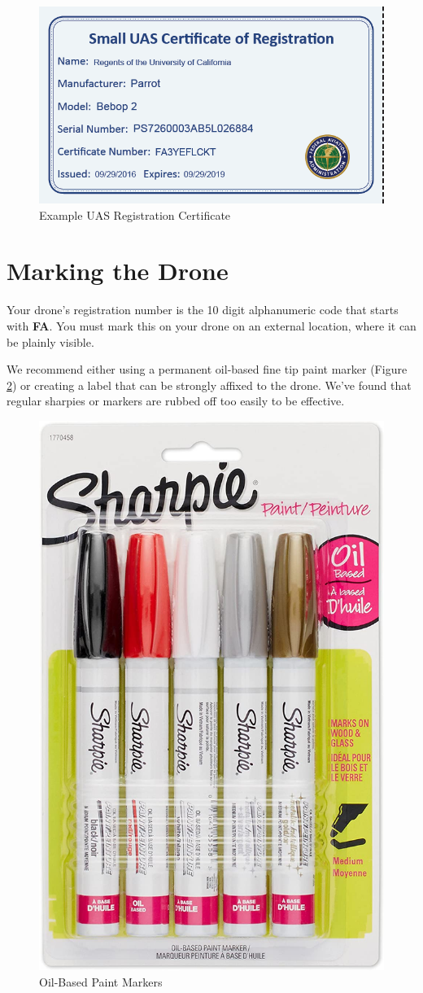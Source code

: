 \documentclass[
]{book}
\begin{document}
\begin{figure}

{\centering \includegraphics[width=0.5\linewidth]{images/reg_cert} 

}

\caption{Example UAS Registration Certificate}\label{fig:reg-cert}
\end{figure}

\hypertarget{marking-the-drone}{%
\section{Marking the Drone}\label{marking-the-drone}}

Your drone's registration number is the 10 digit alphanumeric code that starts with \textbf{FA}. You must mark this on your drone on an external location, where it can be plainly visible.

We recommend either using a permanent oil-based fine tip paint marker (Figure \ref{fig:markers}) or creating a label that can be strongly affixed to the drone. We've found that regular sharpies or markers are rubbed off too easily to be effective.

\begin{figure}

{\centering \includegraphics[width=0.5\linewidth]{images/oil-based-markers} 

}

\caption{Oil-Based Paint Markers}\label{fig:markers}
\end{figure}
\end{document}
